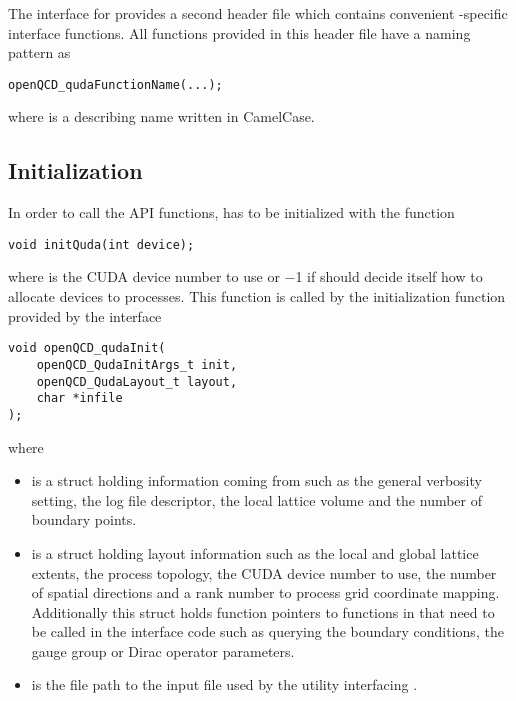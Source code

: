 The interface for \openqxd provides a second header file  which contains convenient \openqxd-specific interface functions.
All functions provided in this header file have a naming pattern as
\begin{verbatim}
openQCD_qudaFunctionName(...);
\end{verbatim}
where  is a describing name written in CamelCase.

\subsection{Initialization}
\label{sec:interface:quda:init}

In order to call the API functions, \quda has to be initialized with the function
\begin{verbatim}
void initQuda(int device);
\end{verbatim}
where  is the CUDA device number to use or \num{-1} if \quda should decide itself how to allocate devices to processes. This function is called by the initialization function provided by the interface
\begin{verbatim}
void openQCD_qudaInit(
    openQCD_QudaInitArgs_t init,
    openQCD_QudaLayout_t layout,
    char *infile
);
\end{verbatim}
where
\begin{itemize}
  \item {} is a struct holding information coming from \openqxd such as the general verbosity setting, the log file descriptor, the local lattice volume and the number of boundary points.
  \item {} is a struct holding layout information such as the local and global lattice extents, the process topology, the CUDA device number to use, the number of spatial \Cstar directions and a rank number to process grid coordinate mapping. Additionally this struct holds function pointers to functions in \openqxd that need to be called in the interface code such as querying the boundary conditions, the gauge group or Dirac operator parameters.
  \item {} is the file path to the input file used by the utility interfacing \quda.
\end{itemize}

